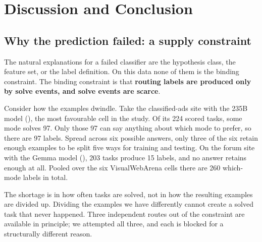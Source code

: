 \chapter{Discussion and Conclusion}
\label{ch:disc}


\section{Why the prediction failed: a supply constraint}
\label{sec:mechanism}

The natural explanations for a failed classifier are the hypothesis class, the
feature set, or the label definition. On this data none of them is the binding
constraint. The binding constraint is that \textbf{routing labels are produced
only by solve events, and solve events are scarce}.

Consider how the examples dwindle. Take the
classified-ads site with the 235B model (), the most
favourable cell in the study. Of its 224 scored tasks, some mode solves 97.
Only those 97 can say anything about which mode to prefer, so there are 97
labels. Spread across six possible answers, only three of the six retain
enough examples to be split five ways for training and testing. On the forum
site with the Gemma model (), 203 tasks produce 15 labels,
and no answer retains enough at all.
Pooled over the six VisualWebArena cells there are 260 which-mode labels in
total.


The shortage is in how often tasks are solved, not in how the resulting
examples are divided up. Dividing the examples we have differently cannot
create a solved task that never happened. Three
independent routes out of the constraint are available in principle; we
attempted all three, and each is blocked for a structurally different reason.

